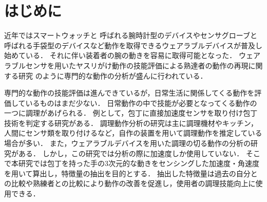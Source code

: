 \section{はじめに}
近年ではスマートウォッチと
呼ばれる腕時計型のデバイスやセンサグローブと呼ばれる手袋型のデバイスなど動作を取得できるウェアラブルデバイスが普及し始めている．
それに伴い装着者の腕の動きを容易に取得可能となった．
ウェアラブルセンサを用いたヤスリがけ動作の技能評価による熟達者の動作の再現に関する研究
\cite{ウェアラブルセンサを用いた熟練指導員のヤスリがけ技能主観評価値の再現}
のように専門的な動作の分析が盛んに行われている．

専門的な動作の技能評価は進んできているが，日常生活に関係してくる動作を評価しているものはまだ少ない．
日常動作の中で技能が必要となってくる動作の一つに調理があげられる．
例として，包丁に直接加速度センサを取り付け包丁技術を判定する研究\cite{加速度センサを用いた包丁技術向上支援システムの提案}がある．
調理動作分析の研究は主に調理機材やキッチン，人間にセンサ類を取り付けるなど，自作の装置を用いて調理動作を推定している場合が多い．
また，ウェアラブルデバイスを用いた調理の切る動作の分析の研究がある\cite{kumazawaanalysis}．
しかし，この研究では分析の際に加速度しか使用していない．
そこで本研究では包丁を持った手の3次元的な動きをセンシングした加速度・角速度を用いて算出し，特徴量の抽出を目的とする．
抽出した特徴量は過去の自分との比較や熟練者との比較により動作の改善を促進し，使用者の調理技能向上に使用できる．
